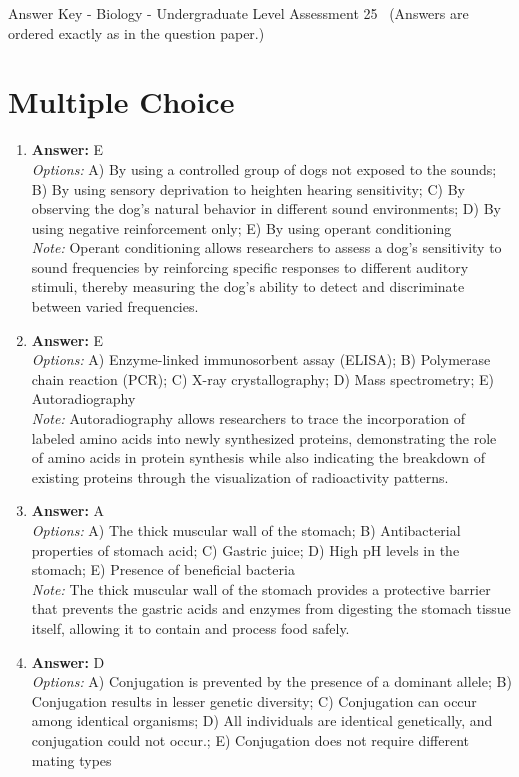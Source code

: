 \documentclass[12pt]{article}
\begin{document}
\begin{center}
Answer Key - Biology - Undergraduate Level Assessment 25 \
\small (Answers are ordered exactly as in the question paper.)
\end{center}

\section*{Multiple Choice}
\begin{enumerate}[label=\arabic*.]
\item \textbf{Answer:} E
\\ \textit{Options:} A) By using a controlled group of dogs not exposed to the sounds; B) By using sensory deprivation to heighten hearing sensitivity; C) By observing the dog's natural behavior in different sound environments; D) By using negative reinforcement only; E) By using operant conditioning
\\ \textit{Note:} Operant conditioning allows researchers to assess a dog's sensitivity to sound frequencies by reinforcing specific responses to different auditory stimuli, thereby measuring the dog's ability to detect and discriminate between varied frequencies.
\item \textbf{Answer:} E
\\ \textit{Options:} A) Enzyme-linked immunosorbent assay (ELISA); B) Polymerase chain reaction (PCR); C) X-ray crystallography; D) Mass spectrometry; E) Autoradiography
\\ \textit{Note:} Autoradiography allows researchers to trace the incorporation of labeled amino acids into newly synthesized proteins, demonstrating the role of amino acids in protein synthesis while also indicating the breakdown of existing proteins through the visualization of radioactivity patterns.
\item \textbf{Answer:} A
\\ \textit{Options:} A) The thick muscular wall of the stomach; B) Antibacterial properties of stomach acid; C) Gastric juice; D) High pH levels in the stomach; E) Presence of beneficial bacteria
\\ \textit{Note:} The thick muscular wall of the stomach provides a protective barrier that prevents the gastric acids and enzymes from digesting the stomach tissue itself, allowing it to contain and process food safely.
\item \textbf{Answer:} D
\\ \textit{Options:} A) Conjugation is prevented by the presence of a dominant allele; B) Conjugation results in lesser genetic diversity; C) Conjugation can occur among identical organisms; D) All individuals are identical genetically, and conjugation could not occur.; E) Conjugation does not require different mating types

\end{enumerate}
\end{document}
